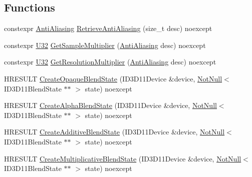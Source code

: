 \subsection*{Functions}
\begin{DoxyCompactItemize}
\item 
constexpr \mbox{\hyperlink{namespacemage_1_1rendering_ac3f75e49e92b42f2f5fb55c450d8899c}{Anti\+Aliasing}} \mbox{\hyperlink{namespacemage_1_1rendering_a3e474e8647b074fb13425a24a8354b77}{Retrieve\+Anti\+Aliasing}} (size\+\_\+t desc) noexcept
\item 
constexpr \mbox{\hyperlink{namespacemage_aa5d6eaabaac3cdd01873d6a3d27e90f3}{U32}} \mbox{\hyperlink{namespacemage_1_1rendering_a8974628b18f5bb28f8f7c570998872d5}{Get\+Sample\+Multiplier}} (\mbox{\hyperlink{namespacemage_1_1rendering_ac3f75e49e92b42f2f5fb55c450d8899c}{Anti\+Aliasing}} desc) noexcept
\item 
constexpr \mbox{\hyperlink{namespacemage_aa5d6eaabaac3cdd01873d6a3d27e90f3}{U32}} \mbox{\hyperlink{namespacemage_1_1rendering_a9b87b3d2d6f992fe51f3bfc52cdb6e72}{Get\+Resolution\+Multiplier}} (\mbox{\hyperlink{namespacemage_1_1rendering_ac3f75e49e92b42f2f5fb55c450d8899c}{Anti\+Aliasing}} desc) noexcept
\item 
H\+R\+E\+S\+U\+LT \mbox{\hyperlink{namespacemage_1_1rendering_a217f724bf8c158f8d77e55a865832dd6}{Create\+Opaque\+Blend\+State}} (I\+D3\+D11\+Device \&device, \mbox{\hyperlink{namespacemage_a8769f9d670d6b585ea306cb1062af94b}{Not\+Null}}$<$ I\+D3\+D11\+Blend\+State $\ast$$\ast$ $>$ state) noexcept
\item 
H\+R\+E\+S\+U\+LT \mbox{\hyperlink{namespacemage_1_1rendering_a142afbabb4446fd8e5ebedbcc999ad47}{Create\+Alpha\+Blend\+State}} (I\+D3\+D11\+Device \&device, \mbox{\hyperlink{namespacemage_a8769f9d670d6b585ea306cb1062af94b}{Not\+Null}}$<$ I\+D3\+D11\+Blend\+State $\ast$$\ast$ $>$ state) noexcept
\item 
H\+R\+E\+S\+U\+LT \mbox{\hyperlink{namespacemage_1_1rendering_a224f4925f5da208c4ff3108884beb1d1}{Create\+Additive\+Blend\+State}} (I\+D3\+D11\+Device \&device, \mbox{\hyperlink{namespacemage_a8769f9d670d6b585ea306cb1062af94b}{Not\+Null}}$<$ I\+D3\+D11\+Blend\+State $\ast$$\ast$ $>$ state) noexcept
\item 
H\+R\+E\+S\+U\+LT \mbox{\hyperlink{namespacemage_1_1rendering_a379bf058f263791fb489c5c4cbea35e8}{Create\+Multiplicative\+Blend\+State}} (I\+D3\+D11\+Device \&device, \mbox{\hyperlink{namespacemage_a8769f9d670d6b585ea306cb1062af94b}{Not\+Null}}$<$ I\+D3\+D11\+Blend\+State $\ast$$\ast$ $>$ state) noexcept

\end{DoxyCompactItemize}
